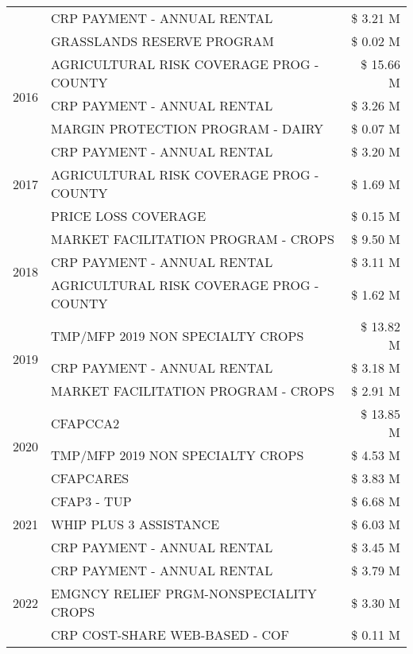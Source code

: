 \begin{tabular}{llr}
 & CRP PAYMENT - ANNUAL RENTAL & \$ 3.21 M \\
 & GRASSLANDS RESERVE PROGRAM & \$ 0.02 M \\
\cline{1-3}
\multirow[t]{3}{*}{2016} & AGRICULTURAL RISK COVERAGE PROG - COUNTY & \$ 15.66 M \\
 & CRP PAYMENT - ANNUAL RENTAL & \$ 3.26 M \\
 & MARGIN PROTECTION PROGRAM - DAIRY & \$ 0.07 M \\
\cline{1-3}
\multirow[t]{3}{*}{2017} & CRP PAYMENT - ANNUAL RENTAL & \$ 3.20 M \\
 & AGRICULTURAL RISK COVERAGE PROG - COUNTY & \$ 1.69 M \\
 & PRICE LOSS COVERAGE & \$ 0.15 M \\
\cline{1-3}
\multirow[t]{3}{*}{2018} & MARKET FACILITATION PROGRAM - CROPS & \$ 9.50 M \\
 & CRP PAYMENT - ANNUAL RENTAL & \$ 3.11 M \\
 & AGRICULTURAL RISK COVERAGE PROG - COUNTY & \$ 1.62 M \\
\cline{1-3}
\multirow[t]{3}{*}{2019} & TMP/MFP 2019 NON SPECIALTY CROPS & \$ 13.82 M \\
 & CRP PAYMENT - ANNUAL RENTAL & \$ 3.18 M \\
 & MARKET FACILITATION PROGRAM - CROPS & \$ 2.91 M \\
\cline{1-3}
\multirow[t]{3}{*}{2020} & CFAPCCA2 & \$ 13.85 M \\
 & TMP/MFP 2019 NON SPECIALTY CROPS & \$ 4.53 M \\
 & CFAPCARES & \$ 3.83 M \\
\cline{1-3}
\multirow[t]{3}{*}{2021} & CFAP3 - TUP & \$ 6.68 M \\
 & WHIP PLUS 3 ASSISTANCE & \$ 6.03 M \\
 & CRP PAYMENT - ANNUAL RENTAL & \$ 3.45 M \\
\cline{1-3}
\multirow[t]{3}{*}{2022} & CRP PAYMENT - ANNUAL RENTAL & \$ 3.79 M \\
 & EMGNCY RELIEF PRGM-NONSPECIALITY CROPS & \$ 3.30 M \\
 & CRP COST-SHARE WEB-BASED - COF & \$ 0.11 M \\
\cline{1-3}
\bottomrule
\end{tabular}
